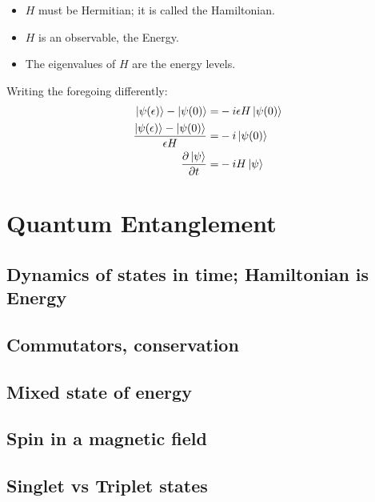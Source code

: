 \documentclass[]{article}
\begin{document}
\begin{itemize}
	\item $H$ must be Hermitian; it is called the Hamiltonian.
	\item $H$ is an observable, the Energy.
	\item The eigenvalues of $H$ are the energy levels.
\end{itemize}
Writing the foregoing differently:
\begin{align*}
	\ket{\psi(\epsilon)} - \ket{\psi(0)} =& -i \epsilon H \ket{\psi(0)}\\
	\frac{\ket{\psi(\epsilon)} - \ket{\psi(0)}}{\epsilon H } =& -i \ket{\psi(0)}\\
	\frac{\partial \ket{\psi}}{\partial t} =& -i H \ket{\psi}
\end{align*}

\section{Quantum Entanglement}

\subsection{Dynamics of states in time; Hamiltonian is Energy}

\subsection{Commutators, conservation}

\subsection{Mixed state of energy}

\subsection{Spin in a magnetic field}

\subsection{Singlet vs Triplet states}


\raggedright

\end{document}
